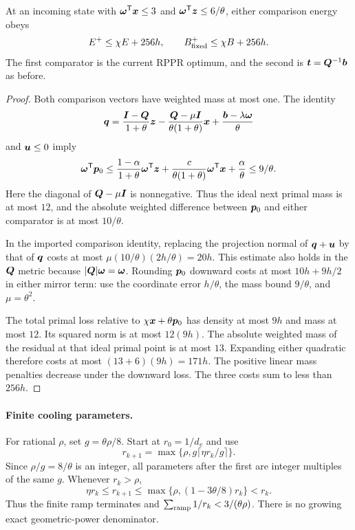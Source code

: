 \begin{lemma}
\label{lem:revisit-rounded-energies}
At an incoming state with
$\bm{\omega}^{\mathsf{T}}\bm{x}\leq3$ and
$\bm{\omega}^{\mathsf{T}}\bm{z}\leq6/\theta$, either comparison energy obeys
\begin{equation}
 E^+\leq\chi E+256h,
 \qquad B_{\rm fixed}^+\leq\chi B+256h.
 \label{eq:revisit-rounded-energy-step}
\end{equation}
The first comparator is the current RPPR optimum, and the second is
$\bm{t}=\bm{Q}^{-1}\bm{b}$ as before.
\end{lemma}
\begin{proof}
Both comparison vectors have weighted mass at most one.
The identity
\[
 \bm{q}=\frac{\bm{I}-\bm{Q}}{1+\theta}\bm{z}
       -\frac{\bm{Q}-\mu\bm{I}}{\theta(1+\theta)}\bm{x}
       +\frac{\bm{b}-\lambda\bm{\omega}}{\theta}
\]
and $\bm{u}\leq0$ imply
\[
 \bm{\omega}^{\mathsf{T}}\bm{p}_0
 \leq\frac{1-\alpha}{1+\theta}\bm{\omega}^{\mathsf{T}}\bm{z}
       +\frac{c}{\theta(1+\theta)}\bm{\omega}^{\mathsf{T}}\bm{x}
       +\frac\alpha\theta\leq9/\theta.
\]
Here the diagonal of $\bm{Q}-\mu\bm{I}$ is nonnegative. Thus the ideal
next primal mass is at most $12$, and the absolute weighted difference
between $\bm{p}_0$ and either comparator is at most $10/\theta$.

In the imported comparison identity, replacing the projection normal of
$\bm{q}+\bm{u}$ by that of $\bm{q}$ costs at most
$\mu(10/\theta)(2h/\theta)=20h$. This estimate also holds in the
$\bm{Q}$ metric because $|\bm{Q}|\bm{\omega}=\bm{\omega}$.
Rounding $\bm{p}_0$ downward costs at most $10h+9h/2$ in either mirror
term: use the coordinate error $h/\theta$, the mass bound $9/\theta$,
and $\mu=\theta^2$.

The total primal loss relative to $\chi\bm{x}+\theta\bm{p}_0$ has density
at most $9h$ and mass at most $12$. Its squared norm is at most
$12(9h)$. The absolute weighted mass of the residual at that ideal
primal point is at most $13$. Expanding either quadratic therefore costs
at most $(13+6)(9h)=171h$. The positive linear mass penalties decrease
under the downward loss. The three costs sum to less than $256h$.
\end{proof}

\paragraph{Finite cooling parameters.}
For rational $\rho$, set $g=\theta\rho/8$. Start at $r_0=1/d_v$ and use
\begin{equation}
 r_{k+1}=\max\{\rho,g\lceil\eta r_k/g\rceil\}.
 \label{eq:revisit-rounded-cooling}
\end{equation}
Since $\rho/g=8/\theta$ is an integer, all parameters after the first
are integer multiples of the same $g$. Whenever $r_k>\rho$,
\[
 \eta r_k\leq r_{k+1}
 \leq\max\{\rho,(1-3\theta/8)r_k\}<r_k.
\]
Thus the finite ramp terminates and
$\sum_{\rm ramp}1/r_k<3/(\theta\rho)$.
There is no growing exact geometric-power denominator.

